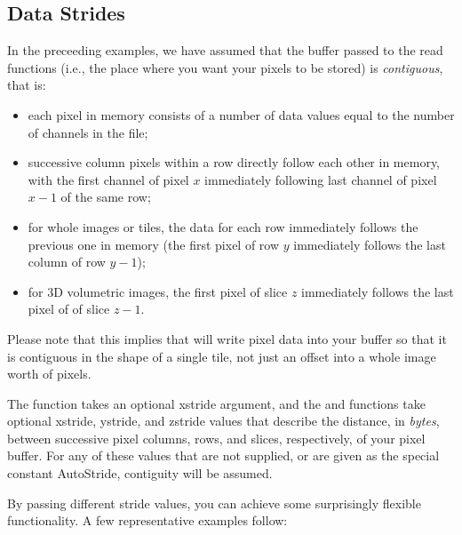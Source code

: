 

\subsection{Data Strides}
\label{sec:imageinput:strides}

In the preceeding examples, we have assumed that the buffer passed to
the {\cf read} functions (i.e., the place where you want your pixels
to be stored) is \emph{contiguous}, that is:

\begin{itemize}
\item each pixel in memory consists of a number of data values equal to
  the number of channels in the file;
\item successive column pixels within a row directly follow each other in
  memory, with the first channel of pixel $x$ immediately following
  last channel of pixel $x-1$ of the same row;
\item for whole images or tiles, the data for each row
  immediately follows the previous one in memory (the first pixel of row
  $y$ immediately follows the last column of row $y-1$);
\item for 3D volumetric images, the first pixel of slice $z$ immediately
  follows the last pixel of of slice $z-1$.
\end{itemize}

Please note that this implies that \readtile will write pixel data into
your buffer so that it is contiguous in the shape of a single tile, not
just an offset into a whole image worth of pixels.

The \readscanline function takes an optional {\cf xstride} argument, and
the \readimage and \readtile functions take optional {\cf xstride}, 
{\cf ystride}, and {\cf zstride} values that describe the distance, in
\emph{bytes}, between successive pixel columns, rows, and slices,
respectively, of your pixel buffer.  For any of these values that are
not supplied, or are given as the special constant {\cf AutoStride},
contiguity will be assumed.

By passing different stride values, you can achieve some surprisingly
flexible functionality.  A few representative examples follow:

